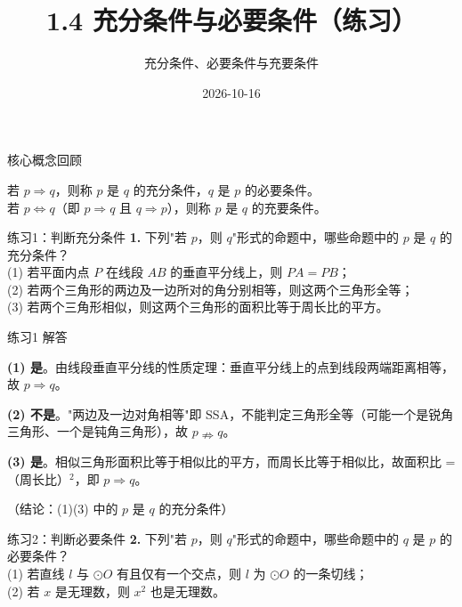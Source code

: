\documentclass[10pt,aspectratio=169,serif]{beamer}
\title[充分条件与必要条件练习]{1.4 充分条件与必要条件（练习）}
\subtitle{充分条件、必要条件与充要条件}
\author{}
\institute{}
\date{2026-10-16}
\begin{document}
\begin{frame}
  \titlepage
\end{frame}

\begin{frame}[t]{核心概念回顾}
\begin{tcolorbox}[colback=blue!5,colframe=blue,title=\textbf{充分条件、必要条件、充要条件}]
若 $p \Rightarrow q$，则称 $p$ 是 $q$ 的\alert{充分条件}，$q$ 是 $p$ 的\alert{必要条件}。\\[0.5em]
若 $p \Leftrightarrow q$（即 $p\Rightarrow q$ 且 $q\Rightarrow p$），则称 $p$ 是 $q$ 的\alert{充要条件}。
\end{tcolorbox}
\end{frame}

\begin{frame}[t]{练习1：判断充分条件}
\textbf{1.} 下列"若 $p$，则 $q$"形式的命题中，哪些命题中的 $p$ 是 $q$ 的充分条件？\\
(1) 若平面内点 $P$ 在线段 $AB$ 的垂直平分线上，则 $PA=PB$；\\
(2) 若两个三角形的两边及一边所对的角分别相等，则这两个三角形全等；\\
(3) 若两个三角形相似，则这两个三角形的面积比等于周长比的平方。
\end{frame}

\begin{frame}[t]{练习1 解答}
\begin{tcolorbox}[colback=orange!10,colframe=orange,title=\textbf{解}]
\textbf{(1) 是}。由线段垂直平分线的性质定理：垂直平分线上的点到线段两端距离相等，故 $p\Rightarrow q$。

\textbf{(2) 不是}。"两边及一边对角相等"即 SSA，不能判定三角形全等（可能一个是锐角三角形、一个是钝角三角形），故 $p\nRightarrow q$。

\textbf{(3) 是}。相似三角形面积比等于相似比的平方，而周长比等于相似比，故面积比 =（周长比）$^2$，即 $p\Rightarrow q$。

\vspace{0.5em}
\small（结论：(1)(3) 中的 $p$ 是 $q$ 的充分条件）
\end{tcolorbox}
\end{frame}

\begin{frame}[t]{练习2：判断必要条件}
\textbf{2.} 下列"若 $p$，则 $q$"形式的命题中，哪些命题中的 $q$ 是 $p$ 的必要条件？\\
(1) 若直线 $l$ 与 $\odot O$ 有且仅有一个交点，则 $l$ 为 $\odot O$ 的一条切线；\\
(2) 若 $x$ 是无理数，则 $x^2$ 也是无理数。
\end{frame}
\end{document}
